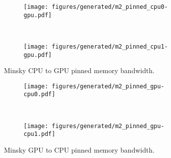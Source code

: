 



\begin{figure}[ht]
    \centering
    \begin{subfigure}[b]{0.45\textwidth}
        \texttt{[image: figures/generated/m2\_pinned\_cpu0-gpu.pdf]}
        \caption{}
        \label{fig:minsky-topo-hardware}
    \end{subfigure}
    ~
    \begin{subfigure}[b]{0.45\textwidth}
        \texttt{[image: figures/generated/m2\_pinned\_cpu1-gpu.pdf]}
        \caption{}
        \label{fig:minsky-topo-cuda-simple}
    \end{subfigure}
    \caption[]{Minsky CPU to GPU pinned memory bandwidth.}
    \label{fig:minsky-pinned-cpu}
\end{figure}

\begin{figure}[ht]
    \centering
    \begin{subfigure}[b]{0.45\textwidth}
        \texttt{[image: figures/generated/m2\_pinned\_gpu-cpu0.pdf]}
        \caption{}
        \label{fig:minsky-topo-hardware}
    \end{subfigure}
    ~
    \begin{subfigure}[b]{0.45\textwidth}
        \texttt{[image: figures/generated/m2\_pinned\_gpu-cpu1.pdf]}
        \caption{}
        \label{fig:minsky-topo-cuda-simple}
    \end{subfigure}
    \caption[]{Minsky GPU to CPU pinned memory bandwidth.}
    \label{fig:minsky-pinned-gpu}
\end{figure}

